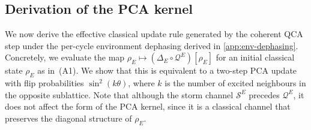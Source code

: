 \subsection{Derivation of the PCA kernel}\label{app:pca-kernel}
We now derive the effective classical update rule generated by the coherent QCA step under the per-cycle environment dephasing derived in \cref{app:env-dephasing}. Concretely, we evaluate the map \(\rho_E \mapsto (\Delta_E \circ \mathcal{Q}^E)[\rho_E]\) for an initial classical state \(\rho_E\) as in~(A1). We show that this is equivalent to a two-step PCA update with flip probabilities \(\sin^2(k\theta)\), where \(k\) is the number of excited neighbours in the opposite sublattice. Note that although the storm channel \(\mathcal{S}^E\) precedes \(\mathcal{Q}^E\), it does not affect the form of the PCA kernel, since it is a classical channel that preserves the diagonal structure of \(\rho_E\).

